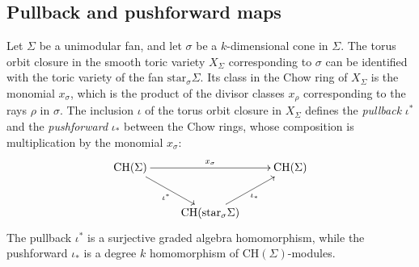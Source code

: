 \documentclass[11pt,reqno]{amsart}
\theoremstyle{definition}
\theoremstyle{remark}
\renewcommand{\(}{\left(}
\renewcommand{\)}{\right)}
\newcommand{\<}{\left<}
\renewcommand{\>}{\right>}
\begin{document}
\subsection{Pullback and pushforward maps}\label{sec:gysin}

Let $\Sigma$ be a unimodular fan, and let $\sigma$ be a $k$-dimensional cone in $\Sigma$.
The torus orbit closure in the smooth toric variety $X_\Sigma$ corresponding to $\sigma$ can be identified with
the toric variety of the fan $\text{star}_\sigma \Sigma$. %
Its class  in the Chow ring of $X_\Sigma$ is the monomial $x_\sigma$, which is 
the product of the divisor classes $x_\rho$ corresponding to the rays $\rho$ in $\sigma$.
The inclusion $\iota$ of the torus orbit closure in $X_\Sigma$ defines the \emph{pullback}  $\iota^*$ and the \emph{pushforward} $\iota_*$ between the Chow rings,
 whose composition
is multiplication by the monomial $x_\sigma$:
\[
\xymatrix{
\mathrm{CH}(\Sigma)  \ar[rr]^{x_\sigma} \ar[dr]_{\iota^*}&&\mathrm{CH}(\Sigma) 
\\
& \mathrm{CH}(\text{star}_\sigma\Sigma) \ar[ur]_{\iota_*}&
}
\]
The pullback $\iota^*$ is a surjective graded algebra homomorphism, while
the pushforward $\iota_*$ is a degree $k$ homomorphism of $\mathrm{CH}(\Sigma)$-modules.
\end{document}
